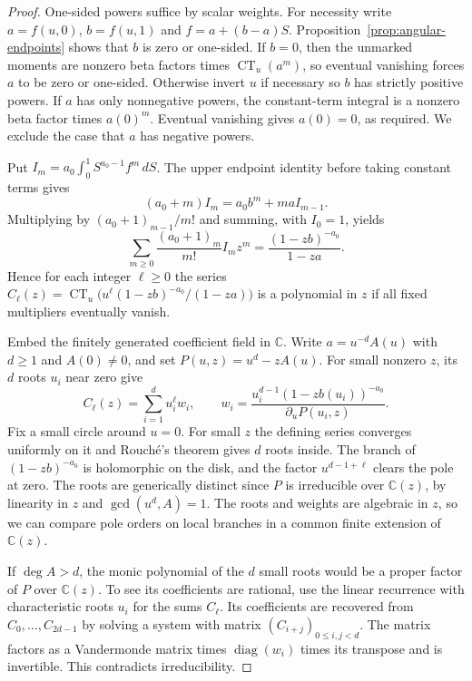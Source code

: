 \documentclass[11pt]{article}
\newcommand{\CT}{\operatorname{CT}}
\begin{document}
\begin{proof}
One-sided powers suffice by scalar weights. For necessity write
\(a=f(u,0)\), \(b=f(u,1)\) and \(f=a+(b-a)S\).
Proposition~\ref{prop:angular-endpoints} shows that \(b\) is zero
or one-sided. If \(b=0\), then the unmarked moments are nonzero beta
factors times \(\CT_u(a^m)\), so eventual vanishing forces \(a\)
to be zero or one-sided. Otherwise invert \(u\) if necessary so
\(b\) has strictly positive powers. If \(a\) has only nonnegative
powers, the constant-term integral is a nonzero beta factor
times \(a(0)^m\). Eventual vanishing gives \(a(0)=0\), as required.
We exclude the case that \(a\) has negative powers.

Put \(I_m=a_0\int_0^1 S^{a_0-1} f^m\,dS\). The upper endpoint
identity before taking constant terms gives
\[
 (a_0+m)I_m=a_0 b^m+ma I_{m-1}.
\]
Multiplying by \((a_0+1)_{m-1}/m!\) and summing, with \(I_0=1\),
yields
\[
             \sum_{m\ge0}\frac{(a_0+1)_m}{m!}I_m z^m
                    =\frac{(1-z b)^{-a_0}}{1-z a}.
\]
Hence for each integer \(\ell\ge0\) the series
\(C_\ell(z)=\CT_u\bigl(u^\ell(1-z b)^{-a_0}/(1-z a)\bigr)\)
is a polynomial in \(z\) if all fixed multipliers eventually vanish.

Embed the finitely generated coefficient field in \(\mathbb C\).
Write \(a=u^{-d}A(u)\) with \(d\ge1\) and \(A(0)\ne0\), and set
\(P(u,z)=u^d-zA(u)\). For small nonzero \(z\), its \(d\) roots
\(u_i\) near zero give
\[
 C_\ell(z)=\sum_{i=1}^{d} u_i^\ell w_i,\qquad
 w_i=\frac{u_i^{d-1}(1-zb(u_i))^{-a_0}}{\partial_u P(u_i,z)}.
\]
Fix a small circle around \(u=0\). For small \(z\) the defining
series converges uniformly on it and Rouché's theorem gives \(d\)
roots inside. The branch of \((1-zb)^{-a_0}\) is holomorphic on
the disk, and the factor \(u^{d-1+\ell}\) clears the pole at zero.
The roots are generically distinct since \(P\) is irreducible
over \(\mathbb C(z)\), by linearity in \(z\) and \(\gcd(u^d,A)=1\).
The roots and weights are algebraic in \(z\), so we can compare
pole orders on local branches in a common finite extension of
\(\mathbb C(z)\).

If \(\deg A>d\), the monic polynomial of the \(d\) small roots
would be a proper factor of \(P\) over \(\mathbb C(z)\).
To see its coefficients are rational, use the linear recurrence
with characteristic roots \(u_i\) for the sums \(C_\ell\).
Its coefficients are recovered from \(C_0,\ldots,C_{2d-1}\)
by solving a system with matrix \((C_{i+j})_{0\le i,j<d}\).
The matrix factors as a Vandermonde matrix times
\(\operatorname{diag}(w_i)\) times its transpose and is invertible.
This contradicts irreducibility.


\end{proof}
\end{document}
